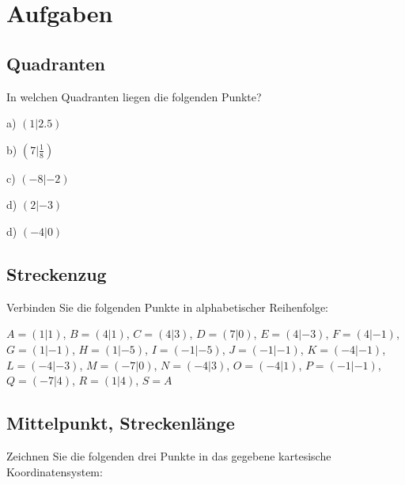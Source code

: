 



\usepackage{amssymb} %
\renewcommand{\metaHeaderLine}{Koordinatensystem}
\renewcommand{\arbeitsblattTitel}{\metaHeaderLine{} Arbeitsblatt (V 1.0)}

\arbeitsblattHeader{}

\section{Aufgaben}

\subsection{Quadranten}
In welchen Quadranten liegen die folgenden Punkte?

a) $(1|2.5)$  

b) $\left(7|\frac18\right)$  

c) $\left(-8|-2\right)$  

d) $\left(2|-3\right)$  

d) $\left(-4|0\right)$  

\newpage
\subsection{Streckenzug}
Verbinden Sie die folgenden Punkte in alphabetischer Reihenfolge:

$A=( 1| 1)$, $B=( 4| 1)$, $C=( 4| 3)$, $D=( 7| 0)$, 
$E=( 4|-3)$, $F=( 4|-1)$, $G=( 1|-1)$, $H=( 1|-5)$, 
$I=(-1|-5)$, $J=(-1|-1)$, $K=(-4|-1)$, $L=(-4|-3)$, 
$M=(-7| 0)$, $N=(-4| 3)$, $O=(-4| 1)$, $P=(-1|-1)$, 
$Q=(-7| 4)$, $R=( 1| 4)$, $S=A$

\newpage%
\subsection{Mittelpunkt, Streckenlänge}
Zeichnen Sie die folgenden drei Punkte in das gegebene kartesische
Koordinatensystem:


